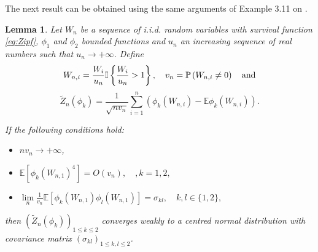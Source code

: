 \documentclass[sn-mathphys-ay]{sn-jnl}%
\newtheorem{lemma}{Lemma}[section]
\renewcommand{\P}{\mathbb{P}}
\newcommand{\E}{\mathbb{E}}
\newcommand{\AssumpAOneText}{(A1)}
\newcommand{\AssumpATwoText}{(A2)}
\newcommand{\AssumpAThreeText}{(A3)}
\begin{document}
\begin{appendices}
The next result can be obtained using the same arguments of Example 3.11 on
\cite{Drees2010}.

\begin{lemma}\label{dress_and_rotzen} Let \(W_n\) be a sequence of i.i.d. random variables with survival function \eqref{eq:Zipf}, \(\phi_1\)
    and \(\phi_2\) bounded functions and \(u_n\) an increasing sequence of real numbers such that \(u_n\to +\infty\).
    Define
    \begin{equation*}
        {W_{n,i}} = \frac{{{W_i}}}{{{u_n}}}\mathbb{I}\left\{ {\frac{{{W_i}}}{{{u_n}}} > 1} \right\}, \quad {v_n} = \P\left( {{W_{n,i}} \ne 0} \right) \quad \textnormal{and}
    \end{equation*}
    \begin{equation*}
        {\widetilde Z_n}\left( {{\phi _k}} \right) = \frac{1}{{\sqrt {n{v_n}} }}\sum\limits_{i = 1}^n {\left( {{\phi _k}\left( {{W_{n,i}}} \right) - \E{\phi _k}\left( {{W_{n,i}}} \right)} \right)}.
    \end{equation*}

    If the following conditions hold:
    \begin{itemize}
        \item[\AssumpAOneText]\label{assumpt:AssumpAOne} \(n v_n\to +\infty\),
        \item[\AssumpATwoText]\label{assumpt:AssumpATwo} \(\E{\left[ {{{\phi _k}\left( {{W_{n,1}}} \right)}^4 } \right]} = O\left( {{v_n}} \right),\quad, k = 1,2,\)
        \item[\AssumpAThreeText]\label{assumpt:AssumpAThree} \(\mathop {\lim }\limits_n \frac{1}{{{v_n}}}{{\E\left[ {{\phi _k}\left( {{W_{n,1}}} \right){\phi _l}\left( {{W_{n,1}}} \right)} \right]} }  = {\sigma _{kl}},\quad k,l \in \{1,2\},\)
    \end{itemize}
    then \({\left( {{{\widetilde Z}_n}\left( {{\phi _k}} \right)} \right)_{1 \leqslant k \leqslant 2}}\) converges weakly to a centred normal distribution
    with covariance matrix \({\left( {{\sigma _{kl}}} \right)_{1 \leqslant k,l \leqslant 2}}\).
\end{lemma}


\end{appendices}
\end{document}
